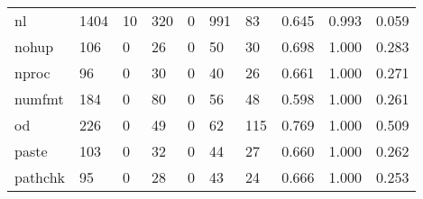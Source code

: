 \begin{longtable}{lp{1.3cm}p{1.3cm}p{1.3cm}p{1.3cm}p{1.3cm}p{1.3cm}p{1.3cm}p{1.3cm}p{1.3cm}}
nl        &                   1404 &                                 10 &                               320 &                                0 &                               991 &                              83 &                                0.645 &                                  0.993 &                                0.059 \\
nohup     &                    106 &                                  0 &                                26 &                                0 &                                50 &                              30 &                                0.698 &                                  1.000 &                                0.283 \\
nproc     &                     96 &                                  0 &                                30 &                                0 &                                40 &                              26 &                                0.661 &                                  1.000 &                                0.271 \\
numfmt    &                    184 &                                  0 &                                80 &                                0 &                                56 &                              48 &                                0.598 &                                  1.000 &                                0.261 \\
od        &                    226 &                                  0 &                                49 &                                0 &                                62 &                             115 &                                0.769 &                                  1.000 &                                0.509 \\
paste     &                    103 &                                  0 &                                32 &                                0 &                                44 &                              27 &                                0.660 &                                  1.000 &                                0.262 \\
pathchk   &                     95 &                                  0 &                                28 &                                0 &                                43 &                              24 &                                0.666 &                                  1.000 &                                0.253 \\

\end{longtable}
